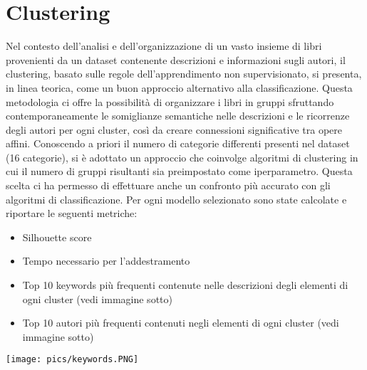 \documentclass[12pt,oneside]{article}
\begin{document}
\newpage
\section{Clustering}
    \begin{justify}
        Nel contesto dell'analisi e dell'organizzazione di un vasto insieme di libri provenienti da un dataset contenente descrizioni e informazioni sugli autori, il clustering, basato sulle regole dell'apprendimento non supervisionato, si presenta, in linea teorica, come un buon approccio alternativo alla classificazione. Questa metodologia ci offre la possibilità di organizzare i libri in gruppi sfruttando contemporaneamente le somiglianze semantiche nelle descrizioni e le ricorrenze degli autori per ogni cluster, così da creare connessioni significative tra opere affini. Conoscendo a priori il numero di categorie differenti presenti nel dataset (16 categorie), si è adottato un approccio che coinvolge algoritmi di clustering in cui il numero di gruppi risultanti sia preimpostato come iperparametro. Questa scelta ci ha permesso di effettuare anche un confronto più accurato con gli algoritmi di classificazione.
        Per ogni modello selezionato sono state calcolate e riportare le seguenti metriche:
        \begin{itemize}
            \item Silhouette score
            \item Tempo necessario per l’addestramento
            \item Top 10 keywords più frequenti contenute nelle descrizioni degli elementi di ogni cluster (vedi immagine sotto)
            \item Top 10 autori più frequenti contenuti negli elementi di ogni cluster (vedi\\ immagine sotto)
        \end{itemize}

        \texttt{[image: pics/keywords.PNG]}
    \end{justify}
\end{document}
